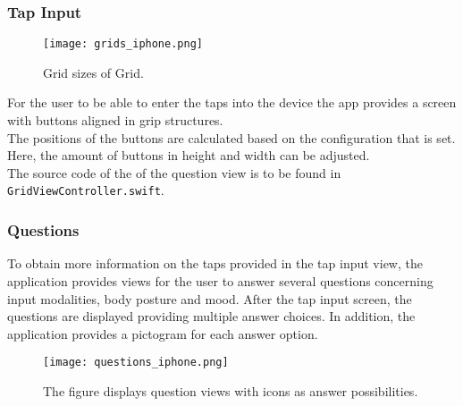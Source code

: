 \subsubsection{Tap Input}

\begin{figure}[h!]
  \centering
  \texttt{[image: grids\_iphone.png]}
  \caption{Grid sizes of Grid. }
\end{figure}

For the user to be able to enter the taps into the device the app provides a screen with buttons aligned in grip structures.\\

The positions of the buttons are calculated based on the configuration that is set. Here, the amount of buttons in height and width can be adjusted. \\


The source code of the of the question view is to be found in \texttt{GridViewController.swift}.


\subsubsection{Questions}
To obtain more information on the taps provided in the tap input view, the application provides views for the user to answer several questions concerning input modalities, body posture and mood.
After the tap input screen, the questions are displayed providing multiple answer choices. In addition, the application provides a pictogram for each answer option.

\begin{figure}[h!]
  \centering
  \texttt{[image: questions\_iphone.png]}
  \caption{The figure displays question views with icons as answer possibilities.}
\end{figure}

